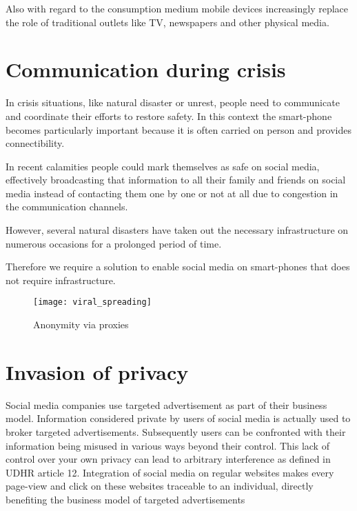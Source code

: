 Also with regard to the consumption medium mobile devices increasingly replace the role of traditional outlets like TV, newspapers and other physical media.


\section{Communication during crisis}
In crisis situations, like natural disaster or unrest, people need to communicate and coordinate their efforts to restore safety.
In this context the smart-phone becomes particularly important because it is often carried on person and provides connectibility.

In recent calamities people could mark themselves as safe on social media, effectively broadcasting that information to all their family and friends on social media instead of contacting them one by one or not at all due to congestion in the communication channels.

However, several natural disasters have taken out the necessary infrastructure on numerous occasions for a prolonged period of time. %

Therefore we require a solution to enable social media on smart-phones that does not require infrastructure. %


\begin{figure}[h]
	\centering
	\texttt{[image: viral\_spreading]}
	\caption{Anonymity via proxies}
	\label{fig:viral_spreading}
\end{figure}


\section{Invasion of privacy}
Social media companies use targeted advertisement as part of their business model.
Information considered private by users of social media is actually used to broker targeted advertisements.
Subsequently users can be confronted with their information being misused in various ways beyond their control.
This lack of control over your own privacy can lead to arbitrary interference as defined in UDHR article 12. %
Integration of social media on regular websites makes every page-view and click on these websites traceable to an individual, directly benefiting the business model of targeted advertisements


